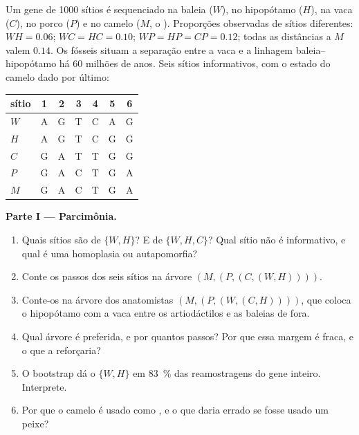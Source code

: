 \begin{problem}
\label{pb:b2:phylogenetic-trees:1}
Um gene de \num{1000} sítios é sequenciado na baleia ($W$), no
hipopótamo ($H$), na vaca ($C$), no porco ($P$) e no camelo ($M$, o
). Proporções observadas de sítios diferentes: $WH = 0.06$; $WC = HC = 0.10$; $WP =
HP = CP = 0.12$; todas as distâncias a $M$ valem $0.14$. Os fósseis
situam a separação entre a vaca e a linhagem baleia--hipopótamo há 60
milhões de anos. Seis sítios informativos, com o estado do camelo dado
por último:
\begin{center}
\begin{tabular}{l@{\quad}cccccc}
sítio & 1 & 2 & 3 & 4 & 5 & 6 \\ \hline
$W$ & A & G & T & C & A & G \\
$H$ & A & G & T & C & G & G \\
$C$ & G & A & T & T & G & G \\
$P$ & G & A & C & T & G & A \\
$M$ & G & A & C & T & G & A \\
\end{tabular}
\end{center}

\medskip
\noindent\textbf{Parte I --- Parcimônia.}
\begin{enumerate}
  \item Quais sítios são  de $\{W, H\}$? E de $\{W, H,
        C\}$? Qual sítio não é informativo, e qual é uma homoplasia
        ou autapomorfia?
  \item Conte os passos dos seis sítios na árvore
        $(M,(P,(C,(W,H))))$.
  \item Conte-os na árvore dos anatomistas $(M,(P,(W,(C,H))))$,
        que coloca o hipopótamo com a vaca entre os artiodáctilos e
        as baleias de fora.
  \item Qual árvore é preferida, e por quantos passos? Por que essa
        margem é fraca, e o que a reforçaria?
  \item O bootstrap dá o  $\{W, H\}$ em \qty{83}{\%} das
        reamostragens do gene inteiro. Interprete.
  \item Por que o camelo é usado como , e o que daria
        errado se fosse usado um peixe?
\end{enumerate}


\end{problem}
